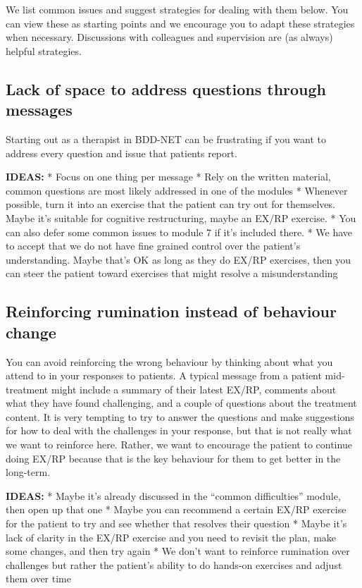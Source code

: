 \documentclass[]{book}
\theoremstyle{definition}
\theoremstyle{definition}
\theoremstyle{definition}
\theoremstyle{remark}
\begin{document}
We list common issues and suggest strategies for dealing with them
below. You can view these as starting points and we encourage you to
adapt these strategies when necessary. Discussions with colleagues and
supervision are (as always) helpful strategies.

\hypertarget{lack-of-space-to-address-questions-through-messages}{%
\subsection{Lack of space to address questions through
messages}\label{lack-of-space-to-address-questions-through-messages}}

Starting out as a therapist in BDD-NET can be frustrating if you want to
address every question and issue that patients report.

\textbf{IDEAS:} * Focus on one thing per message * Rely on the written
material, common questions are most likely addressed in one of the
modules * Whenever possible, turn it into an exercise that the patient
can try out for themselves. Maybe it's suitable for cognitive
restructuring, maybe an EX/RP exercise. * You can also defer some common
issues to module 7 if it's included there. * We have to accept that we
do not have fine grained control over the patient's understanding. Maybe
that's OK as long as they do EX/RP exercises, then you can steer the
patient toward exercises that might resolve a misunderstanding

\hypertarget{reinforcing-rumination-instead-of-behaviour-change}{%
\subsection{Reinforcing rumination instead of behaviour
change}\label{reinforcing-rumination-instead-of-behaviour-change}}

You can avoid reinforcing the wrong behaviour by thinking about what you
attend to in your responses to patients. A typical message from a
patient mid-treatment might include a summary of their latest EX/RP,
comments about what they have found challenging, and a couple of
questions about the treatment content. It is very tempting to try to
answer the questions and make suggestions for how to deal with the
challenges in your response, but that is not really what we want to
reinforce here. Rather, we want to encourage the patient to continue
doing EX/RP because that is the key behaviour for them to get better in
the long-term.

\textbf{IDEAS:} * Maybe it's already discussed in the ``common
difficulties'' module, then open up that one * Maybe you can recommend a
certain EX/RP exercise for the patient to try and see whether that
resolves their question * Maybe it's lack of clarity in the EX/RP
exercise and you need to revisit the plan, make some changes, and then
try again * We don't want to reinforce rumination over challenges but
rather the patient's ability to do hands-on exercises and adjust them
over time
\end{document}
